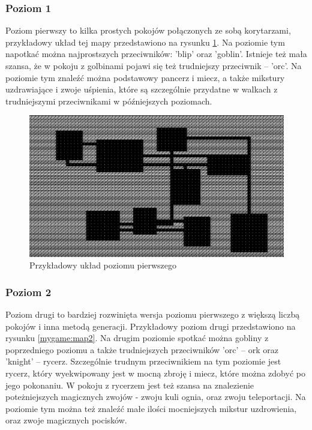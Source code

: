 \documentclass[12pt,twoside]{article}
\begin{document}
\subsubsection{Poziom 1}
Poziom pierwszy to kilka prostych pokojów połączonych ze sobą korytarzami, przykładowy układ tej mapy przedstawiono na rysunku \ref{mygame:map1}. Na poziomie tym napotkać można najprostszych przeciwników: 'blip' oraz 'goblin'. Istnieje też mała szansa, że w pokoju z golbinami pojawi się też trudniejszy przeciwnik -- 'orc'. Na poziomie tym znaleźć można podstawowy pancerz i miecz, a także mikstury uzdrawiające i zwoje uśpienia, które są szczególnie przydatne w walkach z trudniejszymi przeciwnikami w późniejszych poziomach.

\FloatBarrier
\begin{figure}[h]
	\centering
	\includegraphics[width=12cm]{images/mygame/map1.png}
	\caption{Przykładowy układ poziomu pierwszego}
	\label{mygame:map1}
\end{figure}
\FloatBarrier


\subsubsection{Poziom 2}
Poziom drugi to bardziej rozwinięta wersja poziomu pierwszego z większą liczbą pokojów i inna metodą generacji. Przykładowy poziom drugi przedstawiono na rysunku \ref{mygame:map2}. Na drugim poziomie spotkać można gobliny z poprzedniego poziomu a także trudniejszych przeciwników 'orc' -- ork oraz 'knight' -- rycerz. Szczególnie trudnym przeciwnikiem na tym poziomie jest rycerz, który wyekwipowany jest w mocną zbroję i miecz, które można zdobyć po jego pokonaniu. W pokoju z rycerzem jest też szansa na znalezienie poteżniejszych magicznych zwojów - zwoju kuli ognia, oraz zwoju teleportacji. Na poziomie tym można też znaleźć małe ilości mocniejszych mikstur uzdrowienia, oraz zwoje magicznych pocisków.
\end{document}
